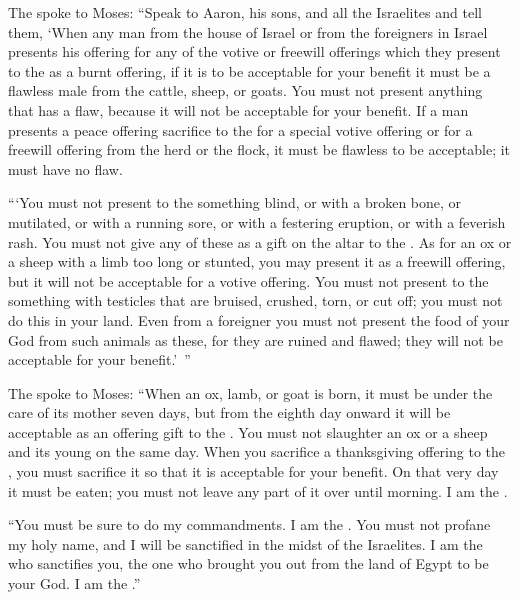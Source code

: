 {\par }{\PP {}The
{}
spoke
to
Moses:
“Speak
to
Aaron,
his sons,
and all
the Israelites
and tell
them,
‘When any
man
from the house
of Israel
or from
the foreigners
in Israel
presents
his offering
for any
of the votive
or freewill
offerings which
they present
to the
{}
as a burnt offering,
if it is to be acceptable for your benefit
it must be a flawless
male
from the cattle,
sheep,
or goats.
You must not
present
anything
that
has a flaw,
because
it will not
be acceptable for your benefit.
If
a man
presents
a peace offering
sacrifice
to the
{}
for
a special
votive offering
or
for a freewill
offering from the herd
or
the flock,
it must be flawless
to be
acceptable;
it must have no
flaw.
\par }{\PP {}“‘You must not
present
to the
{}
something blind,
or
with a broken
bone, or
mutilated,
or
with a running sore,
or
with a festering eruption,
or
with a feverish rash.
You must not
give
any of these
as a gift
on
the altar
to the
{}.
As for an ox
or a sheep
with a limb
too long or stunted,
you may present
it as a freewill offering,
but it will not
be acceptable
for a votive offering.
You must not
present
to the
{}
something with testicles
that are bruised,
crushed, torn, or cut off;
you must not
do
this in your land.
Even from a foreigner
you must not
present
the
food
of your God
from such animals
as these,
for
they are ruined
and flawed;
they will not
be acceptable for your benefit.’ ”
\par }{\PP {}The
{}
spoke
to
Moses:
“When
an ox,
lamb,
or
goat
is born,
it must be
under
the care of its mother
seven
days,
but from the eighth
day
onward
it will be acceptable
as an offering
gift
to the
{}.
You must not
slaughter
an ox
or
a sheep
and its young
on the same
day.
When
you sacrifice
a thanksgiving
offering to the
{}, you must sacrifice it so that it is acceptable for your benefit.
On that very day
it must be eaten;
you must not
leave any
part
of it
over until
morning.
I am
the {}.
\par }{\PP {}“You must be sure
to do
my commandments.
I am
the {}.
You must not
profane
my holy
name,
and I will be sanctified
in the midst
of the Israelites.
I am
the {}
who sanctifies you,
the one who brought you out
from the land
of Egypt
to be
your God.
I am
the {}.”

}
